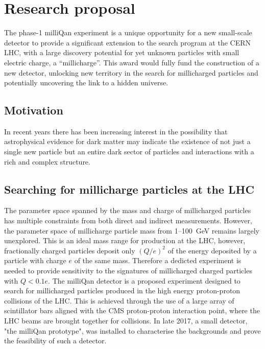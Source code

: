 \documentclass[11pt]{article}
\theoremstyle{plain} \numberwithin{equation}{section}
\theoremstyle{definition}
\begin{document}
\section*{Research proposal}
\noindent 

The phase-1 milliQan experiment is a unique opportunity for a 
new small-scale detector to provide a significant extension to the search 
program at the CERN LHC, with a large discovery potential 
for yet unknown particles with small electric charge, a ``millicharge''. 
This award would fully fund the construction of a new detector,
unlocking new territory in the search for millicharged particles and
potentially uncovering the link to a hidden universe.

\subsection*{Motivation}

In recent years there has been increasing interest in the possibility 
that astrophysical evidence for dark matter may indicate the existence 
of not just a single new particle but an entire dark sector
of particles and interactions with a rich and complex structure. 
%
\subsection*{Searching for millicharge particles at the LHC}
%
The parameter space spanned by the mass and charge of millicharged particles
has multiple constraints from both direct and indirect measurements.
However, the parameter space of millicharge particle mass from 1--100~GeV remains 
largely unexplored. This is an ideal mass
range for production at the LHC, however,
fractionally charged particles deposit only $(Q/e)^2$ of the energy 
deposited by a particle with charge $e$ of
the same mass. Therefore a dedicted experiment is needed to provide sensitivity to the signatures of 
millicharged charged particles with $Q< 0.1 e$. The milliQan detector is a proposed experiment
designed to search for millicharged particles produced in the
high energy proton-proton collisions of the LHC. 
This is achieved through the use of a 
large array of scintillator bars aligned with the CMS proton-proton 
interaction point, where the LHC beams are brought together for collisions. 
In late 2017, a small detector, "the milliQan prototype", was installed to characterise the backgrounds and
prove the feasibility of such a detector.
\end{document}
